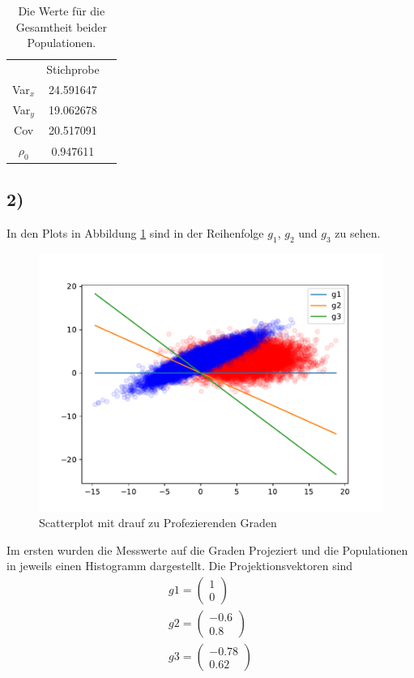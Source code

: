 \begin{table}[H]
  \centering
  \begin{tabular}{c c c}
    & Stichprobe \\
    Var$_x$ & 24.591647 \\
    Var$_y$ & 19.062678 \\
    Cov & 20.517091 \\
    $\rho_0$ & 0.947611 \\
  \end{tabular}
  \caption{Die Werte für die Gesamtheit beider Populationen.}
\end{table}





\subsection*{2)}
In den Plots in Abbildung \ref{fig:sca} sind in der Reihenfolge $g_1$, $g_2$ und $g_3$ zu sehen.
\begin{figure}
  \centering
  \includegraphics[width=\linewidth]{Python/Scatter.pdf}
  \caption{Scatterplot mit drauf zu Profezierenden Graden}
  \label{fig:sca}
\end{figure}
Im ersten wurden die Messwerte auf die Graden Projeziert und die Populationen in jeweils einen Histogramm dargestellt. Die Projektionsvektoren sind
\begin{eqnarray}
  g1 = \begin{pmatrix}	1 \\ 0 \end{pmatrix}	\\
  g2 = \begin{pmatrix}	-0.6 \\ 0.8 \end{pmatrix} 	\\
  g3 = \begin{pmatrix}	-0.78 \\ 0.62 \end{pmatrix}
\end{eqnarray}

